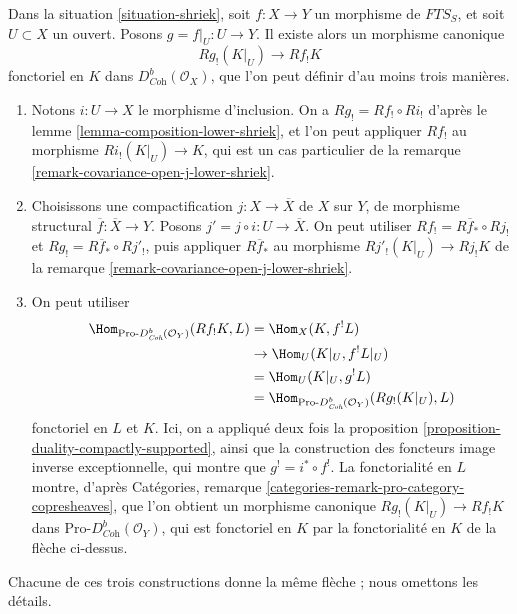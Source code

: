 \begin{remark}
\label{remark-covariance-open-lower-shriek}
Dans la situation \ref{situation-shriek}, soit $f : X \to Y$ un morphisme de $\textit{FTS}_S$, et soit $U \subset X$ un ouvert. Posons $g = f|_U : U \to Y$. Il existe alors un morphisme canonique
$$
Rg_!(K|_U) \longrightarrow Rf_!K
$$
fonctoriel en $K$ dans $D^b_{\textit{Coh}}(\mathcal{O}_X)$, que l'on peut définir d'au moins trois manières.
\begin{enumerate}
\item Notons $i : U \to X$ le morphisme d'inclusion. On a $Rg_! = Rf_! \circ Ri_!$ d'après le lemme \ref{lemma-composition-lower-shriek}, et l'on peut appliquer $Rf_!$ au morphisme $Ri_!(K|_U) \to K$, qui est un cas particulier de la remarque \ref{remark-covariance-open-j-lower-shriek}.
\item Choisissons une compactification $j : X \to \overline{X}$ de $X$ sur $Y$, de morphisme structural $\overline{f} : \overline{X} \to Y$. Posons $j' = j \circ i : U \to \overline{X}$. On peut utiliser $Rf_! = R\overline{f}_* \circ Rj_!$ et $Rg_! = R\overline{f}_* \circ Rj'_!$, puis appliquer $R\overline{f}_*$ au morphisme $Rj'_!(K|_U) \to Rj_!K$ de la remarque \ref{remark-covariance-open-j-lower-shriek}.
\item On peut utiliser
\begin{align*}
\Hom_{\text{Pro-}D^b_{\textit{Coh}}(\mathcal{O}_Y)}(Rf_!K, L)
& =
\Hom_X(K, f^!L) \\
& \to
\Hom_U(K|_U, f^!L|_U) \\
& =
\Hom_U(K|_U, g^!L) \\
& =
\Hom_{\text{Pro-}D^b_{\textit{Coh}}(\mathcal{O}_Y)}(Rg_!(K|_U), L)
\end{align*}
fonctoriel en $L$ et $K$. Ici, on a appliqué deux fois la proposition \ref{proposition-duality-compactly-supported}, ainsi que la construction des foncteurs image inverse exceptionnelle, qui montre que $g^! = i^* \circ f^!$. La fonctorialité en $L$ montre, d'après Catégories, remarque \ref{categories-remark-pro-category-copresheaves}, que l'on obtient un morphisme canonique $Rg_!(K|_U) \to Rf_!K$ dans $\text{Pro-}D^b_{\textit{Coh}}(\mathcal{O}_Y)$, qui est fonctoriel en $K$ par la fonctorialité en $K$ de la flèche ci-dessus.
\end{enumerate}
Chacune de ces trois constructions donne la même flèche ; nous omettons les détails.
\end{remark}

